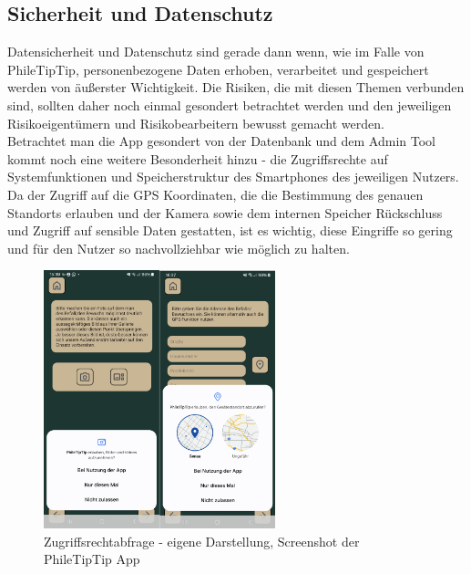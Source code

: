 \subsection{Sicherheit und Datenschutz}


Datensicherheit und Datenschutz sind gerade dann wenn, wie im Falle von PhileTipTip, personenbezogene Daten erhoben, verarbeitet und gespeichert werden von äußerster Wichtigkeit. Die Risiken, die mit diesen Themen verbunden sind, sollten daher noch einmal gesondert betrachtet werden und den jeweiligen Risikoeigentümern und Risikobearbeitern bewusst gemacht werden.\\

Betrachtet man die App gesondert von der Datenbank und dem Admin Tool kommt noch eine weitere Besonderheit hinzu - die Zugriffsrechte auf Systemfunktionen und Speicherstruktur des Smartphones des jeweiligen Nutzers. Da der Zugriff auf die GPS Koordinaten, die die Bestimmung des genauen Standorts erlauben und der Kamera sowie dem internen Speicher Rückschluss und Zugriff auf sensible Daten gestatten, ist es wichtig, diese Eingriffe so gering und für den Nutzer so nachvollziehbar wie möglich zu halten.\\

\begin{figure}[!h]
\centering
\includegraphics[width=0.6\textwidth]{Zugriffsrechte}
\caption{Zugriffsrechtabfrage - eigene Darstellung, Screenshot der PhileTipTip App}
\end{figure}

